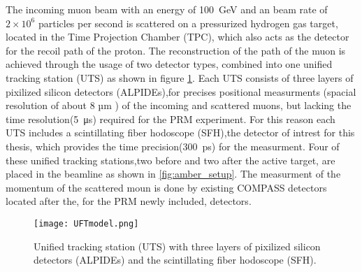 The incoming muon beam with an energy of \SI{100} {\giga\electronvolt}\autocite{ProposalAmber} and an beam rate of $2 \times 10^6$\autocite{ConfrancePaperDAQ} particles per second is scattered on a pressurized hydrogen gas target, located in the Time Projection Chamber (TPC), 
which also acts as the detector for the recoil path of the proton.
\newline
The reconstruction of the path of the muon is achieved through the usage of two detector types,
combined into one unified tracking station (UTS) as shown in figure \ref{UTSpicture}.
\newline
Each UTS consists of three layers of pixilized silicon detectors (ALPIDEs),for precises positional measurments (spacial resolution of about 8 µm \autocite{Amber2022Status}) of the incoming and scattered muons, 
but lacking the time resolution(\SI{5} {\micro\second}\autocite{Amber2022Status}) required for the PRM experiment.
For this reason each UTS includes a scintillating fiber hodoscope (SFH),the detector of intrest for this thesis,
 which provides the time precision(\SI{300} {\pico\second}\Autocite{Amber2022Status}) for the measurment.
 \newline
Four of these unified tracking stations,two before and two after the active target, are placed in the beamline as shown in \ref{fig:amber_setup}.
The measurment of the momentum of the scattered moun is done by existing COMPASS detectors located after the, 
for the PRM newly included, detectors\autocite{ProposalAmber}.

\begin{figure}[H]	
	\centering
	\texttt{[image: UFTmodel.png]}
	\caption{Unified tracking station (UTS) with three layers of pixilized silicon detectors (ALPIDEs) and the scintillating fiber hodoscope (SFH). \autocite{InternalcommunicationKarl}}
	\label{UTSpicture}
\end{figure}
